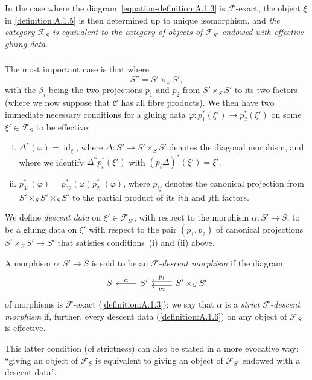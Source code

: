 \documentclass{article}
\theoremstyle{plain}
\theoremstyle{definition}
\newenvironment{definition}[1]
  {\renewcommand\theinnercustomdefinition{#1}\innercustomdefinition}
  {\endinnercustomdefinition}
\newcommand{\sh}[1]{{\mathscr{#1}}}
\newcommand{\cat}[1]{{\mathcal{#1}}}
\DeclareMathOperator{\id}{id}
\newcommand{\oldpage}[1]{\marginpar{\footnotesize$\Big\vert$ \textit{p.~#1}}}
\begin{document}
In the case where the diagram~\cref{equation-definition:A.1.3} is $\sh{F}$-exact, the object $\xi$ in \cref{definition:A.1.5} is then determined up to unique isomorphism, and \emph{the category $\sh{F}_S$ is equivalent to the category of objects of $\sh{F}_{S'}$ endowed with effective gluing data}.


\subsubsection{}
\label{A.1.c}
The most important case is that where
\[
  S'' = S' \times_S S',
\]
with the $\beta_i$ being the two projections $p_1$ and $p_2$ from $S'\times_S S'$ to its two factors (where we now suppose that $\cat{C}$ has all fibre products).
We then have two immediate necessary conditions for a gluing data $\varphi\colon p_1^*(\xi')\to p_2^*(\xi')$ on some $\xi'\in\sh{F}_S$ to be effective:
\begin{enumerate}[(i)]
  \item $\Delta^*(\varphi) = \id_\xi$, where $\Delta\colon S'\to S'\times_S S'$ denotes the diagonal morphism, and where we identify $\Delta^* p_i^*(\xi')$ with $(p_i\Delta)^*(\xi')=\xi'$.
  \item $p_{31}^*(\varphi) = p_{32}^*(\varphi)p_{21}^*(\varphi)$,
\oldpage{190-05}
  where $p_{ij}$ denotes the canonical projection from $S'\times_S S'\times_S S'$ to the partial product of its $i$th and $j$th factors.
\end{enumerate}

\begin{definition}{1.6}
\label{definition:A.1.6}
  We define \emph{descent data} on $\xi'\in\sh{F}_{S'}$, with respect to the morphism $\alpha\colon S'\to S$, to be a gluing data on $\xi'$ with respect to the pair $(p_1,p_2)$ of canonical projections $S'\times_S S'\to S'$ that satisfies conditions~(i) and (ii) above.
\end{definition}

\begin{definition}{1.7}
\label{definition:A.1.7}
  A morphism $\alpha\colon S'\to S$ is said to be an \emph{$\sh{F}$-descent morphism} if the diagram
  \[
    \begin{tikzcd}
      S
      & S' \lar[swap,"\alpha"]
      & S'\times_S S' \lar[shift left=1,"p_2"] \lar[shift right=1,swap,"p_1"]
    \end{tikzcd}
  \]
  of morphisms is $\sh{F}$-exact (\cref{definition:A.1.3});
  we say that $\alpha$ is a \emph{strict $\sh{F}$-descent morphism} if, further, every descent data (\cref{definition:A.1.6}) on any object of $\sh{F}_{S'}$ is effective.

  This latter condition (of strictness) can also be stated in a more evocative way:
  ``giving an object of $\sh{F}_S$ is equivalent to giving an object of $\sh{F}_{S'}$ endowed with a descent data''.
\end{definition}
\end{document}
